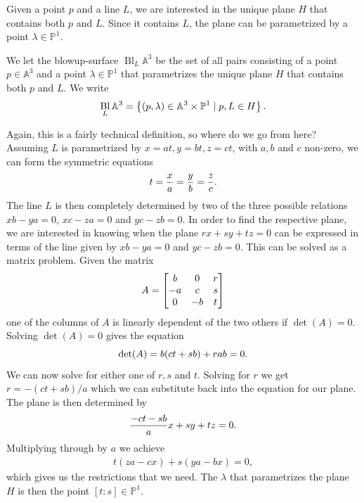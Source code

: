 \documentclass{article}
\newcommand{\A}{\ensuremath{\mathbb{A}}}
\renewcommand{\P}{\ensuremath{\mathbb{P}}}
\DeclareMathOperator{\Bl}{Bl}
\begin{document}
    \begin{definition}[Blowup of $\A^3$ at a line $L$] 
        Given a point $p$ and a line $L$, we are interested in the unique plane
        $H$ that contains both $p$ and $L$.  Since it contains $L$, the plane
        can be parametrized by a point $\lambda \in \P^1$. 

        We let the blowup-surface $\Bl_L\A^3$ be the set of all pairs
        consisting of a point $p \in \A^3$ and a point $\lambda \in \P^1$ that
        parametrizes the unique plane $H$ that contains both $p$ and $L$.  We
        write
        \begin{equation}
            \notag
            \Bl_L\A^3 = \left\{ (p, \lambda) \in \A^3 \times \P^1 \mid p, L \in H \right\}.
        \end{equation}
    \end{definition}
    
    Again, this is a fairly technical definition, so where do we go from here?
    Assuming $L$ is parametrized by $x = at, y = bt, z = ct$, with $a, b$ and
    $c$ non-zero, we can form the symmetric equations 
    \begin{equation}
        \notag
        t = \frac{x}{a} = \frac{y}{b} = \frac{z}{c}.
    \end{equation}
    The line $L$ is then completely determined by two of the three possible
    relations $xb - ya = 0$, $xc - za = 0$ and $yc - zb = 0$.  In order to find
    the respective plane, we are interested in knowing when the plane $rx + sy
    + tz = 0$ can be expressed in terms of the line given by $xb - ya = 0$ and
    $yc - zb = 0$. This can be solved as a matrix problem. Given the matrix
    \begin{equation}
        \notag
        A = \begin{bmatrix}
            b & 0 & r \\
            -a & c & s \\
            0 & -b & t
        \end{bmatrix}
    \end{equation}
    one of the columns of $A$ is linearly dependent of the two others if
    $\det(A) = 0$. Solving $\det(A) = 0$ gives the equation
    \begin{equation}
        \notag
        \det(A) = b(ct + sb) + rab = 0.
    \end{equation}
    We can now solve for either one of $r, s$ and $t$. Solving for $r$ we get
    $r = -( ct + sb ) / a$ which we can substitute back into the equation for
    our plane.  The plane is then determined by 
    \begin{equation}
        \notag
        \frac{-ct - sb}{a}x + sy + tz = 0.
    \end{equation}
    Multiplying through by $a$ we achieve
    \begin{align*}
                                t(za - cx) + s(ya - bx) = 0,
    \end{align*}
    which gives us the restrictions that we need. The $\lambda$ that
    parametrizes the plane $H$ is then the point $[t:s] \in \P^1$.
\end{document}
